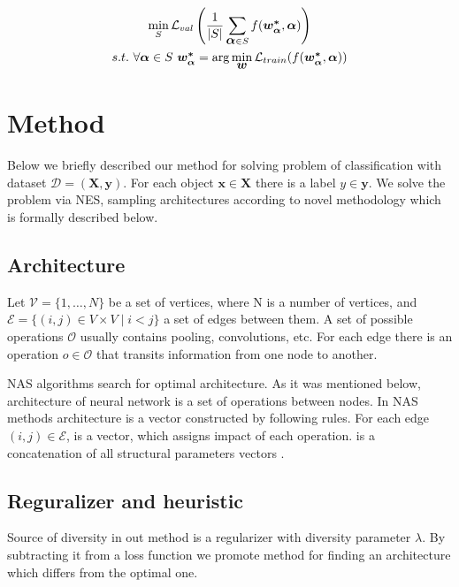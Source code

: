 \documentclass{article}
\begin{document}
\begin{gather*}
	\min_S \mathcal{L}_{val}\left(\frac{1}{|S|}\sum_{\mbox{\boldmath{$\alpha$}} \in S}f(\mbox{\boldmath{$w_\alpha^*$}}, \mbox{\boldmath{$\alpha$}})\right) \\
s.t. \text{ }\forall \mbox{\boldmath{$\alpha$}} \in S \text{ } \mbox{\boldmath{$w_\alpha^*$}} = \arg \min_{\mbox{\boldmath{$w$}}} \mathcal{L}_{train}(f(\mbox{\boldmath{$w_\alpha^*$}}, \mbox{\boldmath{$\alpha$}}))
\end{gather*}

\section{Method}

Below we briefly described our method for solving problem of classification with dataset $\mathcal{D} = (\mathbf{X}, \mathbf{y})$. For each object $\mathbf{x} \in \mathbf{X}$ there is a label $y \in \mathbf{y}$. We solve the problem via NES, sampling architectures according to novel methodology which is formally described below.

\subsection{Architecture}

Let $\mathcal{V} = \{ 1, \ldots, N \}$ be a set of vertices, where N is a number of vertices, and $\mathcal{E} = \{ (i, j) \in V \times V \mid i < j \}$ a set of edges between them. A set of possible operations
$\mathcal{O}$ usually contains pooling, convolutions, etc.
For each edge there is an operation $o \in \mathcal{O}$ that transits information from one node to another.

NAS algorithms search for optimal architecture. 
As it was mentioned below, architecture of neural network is a set of operations between nodes. In NAS methods architecture is a vector constructed by following rules. For each edge $(i, j) \in \mathcal{E}$, \mbox{} is a vector, which assigns impact of each operation.
\mbox{\boldmath{$\alpha$}} is a concatenation of all structural parameters vectors \mbox{}.

\subsection{Reguralizer and heuristic}

Source of diversity in out method is a regularizer with diversity parameter $\lambda$. By subtracting it from a loss function we promote method for finding an architecture which differs from the optimal one.
\end{document}
